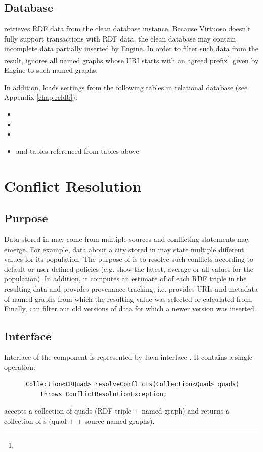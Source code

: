 \section{Database}
\QE retrieves RDF data from the clean database instance. Because Virtuoso doesn't fully support transactions with RDF data, the clean database may contain incomplete data partially inserted by Engine. In order to filter such data from the result, \QE ignores all named graphs whose URI starts with an agreed prefix\footnote{} given by Engine to such named graphs.

In addition, \QE loads settings from the following tables in relational database (see Appendix \ref{chap:reldb}):

\begin{itemize}
	\item {}
	\item {} 
	\item {} 
	\item and tables referenced from tables above
\end{itemize}

\chapter{Conflict Resolution}
\label{sec:CR}

\section{Purpose}
Data stored in \odcs may come from multiple sources and conflicting statements may emerge. For example, data about a city stored in \odcs may state multiple different values for its population. The purpose of \CR is to resolve such conflicts according to default or user-defined policies (e.g. show the latest, average or all values for the population). In addition, it computes an estimate of \aggrq of each RDF triple in the resulting data and provides provenance tracking, 	i.e. provides URIs and metadata of named graphs from which the resulting value was selected or calculated from. Finally, \CR can filter out old versions of data for which a newer version was inserted.

\todo{}

\section{Interface}
Interface of the \CR component is represented by Java interface . It contains a single operation:
\begin{verbatim}
      Collection<CRQuad> resolveConflicts(Collection<Quad> quads)
          throws ConflictResolutionException;
\end{verbatim}
\CR accepts a collection of quads (RDF triple + named graph) and returns a collection of s (quad + \aggrq + source named graphs).

